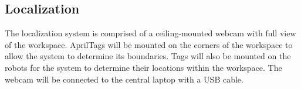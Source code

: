 
\subsection{Localization}
\label{sec:hardware_localization}

The localization system is comprised of a ceiling-mounted webcam with full view of the workspace. AprilTags will be mounted on the corners of the workspace to allow the system to determine its boundaries. Tags will also be mounted on the robots for the system to determine their locations within the workspace. The webcam will be connected to the central laptop with a USB cable.